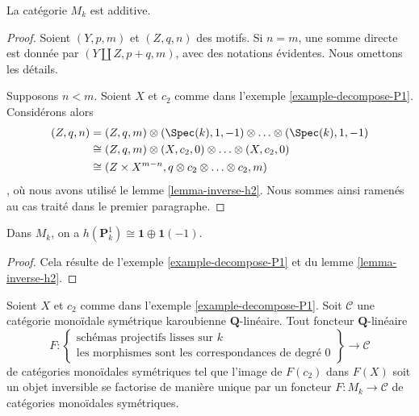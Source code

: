 \begin{lemma}
\label{lemma-additive}
La catégorie $M_k$ est additive.
\end{lemma}

\begin{proof}
Soient $(Y, p, m)$ et $(Z, q, n)$ des motifs. Si $n = m$, une
somme directe est donnée par $(Y \amalg Z, p + q, m)$, avec des notations évidentes.
Nous omettons les détails.

\medskip\noindent
Supposons $n < m$. Soient $X$ et $c_2$ comme dans
l'exemple \ref{example-decompose-P1}. Considérons alors
\begin{align*}
(Z, q, n)
& =
(Z, q, m) \otimes (\Spec(k), 1, -1) \otimes \ldots \otimes
(\Spec(k), 1, -1) \\
& \cong
(Z, q, m) \otimes (X, c_2, 0) \otimes \ldots \otimes (X, c_2, 0) \\
& \cong
(Z \times X^{m - n}, q \otimes c_2 \otimes \ldots \otimes c_2, m)
\end{align*},
où nous avons utilisé le lemme \ref{lemma-inverse-h2}.
Nous sommes ainsi ramenés au cas traité dans le premier paragraphe.
\end{proof}

\begin{lemma}
\label{lemma-decompose-P1}
Dans $M_k$, on a $h(\mathbf{P}^1_k) \cong \mathbf{1} \oplus \mathbf{1}(-1)$.
\end{lemma}

\begin{proof}
Cela résulte de l'exemple \ref{example-decompose-P1} et du
lemme \ref{lemma-inverse-h2}.
\end{proof}

\begin{lemma}
\label{lemma-characterize-motives}
Soient $X$ et $c_2$ comme dans l'exemple \ref{example-decompose-P1}.
Soit $\mathcal{C}$ une catégorie monoïdale symétrique karoubienne
$\mathbf{Q}$-linéaire. Tout foncteur $\mathbf{Q}$-linéaire
$$
F :
\left\{
\begin{matrix}
\text{schémas projectifs lisses sur }k\\
\text{les morphismes sont les correspondances de degré }0
\end{matrix}
\right\}
\longrightarrow
\mathcal{C}
$$
de catégories monoïdales symétriques tel que l'image de $F(c_2)$ dans
$F(X)$ soit un objet inversible se factorise de manière unique par un foncteur
$F : M_k \to \mathcal{C}$ de catégories monoïdales symétriques.
\end{lemma}

